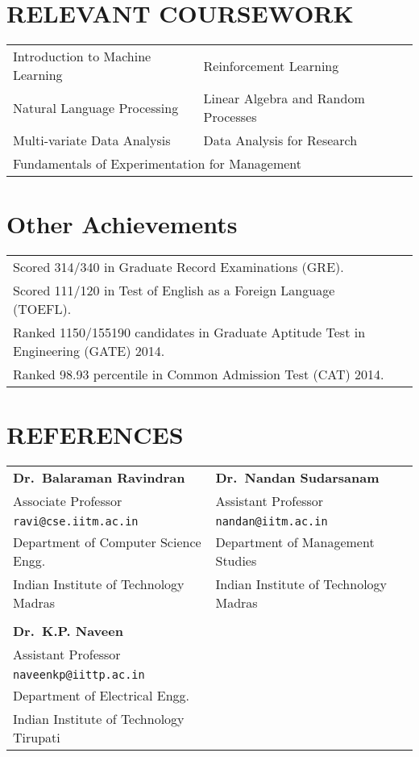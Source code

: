 \documentclass[margin,11pt]{res}
\begin{document}
\begin{resume}
\section{RELEVANT COURSEWORK}
\begin{tabular}{ll}
Introduction to Machine Learning & Reinforcement Learning  \\
Natural Language Processing & Linear Algebra and Random Processes \\
Multi-variate Data Analysis & Data Analysis for Research \\
\multicolumn{2}{l}{Fundamentals of Experimentation for Management}
\end{tabular}

\section{Other Achievements}
\begin{tabular}{ll}
Scored 314/340 in Graduate Record Examinations (GRE).\\
Scored 111/120 in Test of English as a Foreign Language (TOEFL).\\
Ranked 1150/155190 candidates in Graduate Aptitude Test in Engineering (GATE) 2014. \\
Ranked 98.93 percentile in Common Admission Test (CAT) 2014.
\end{tabular}

\section{REFERENCES}
\begin{tabular}{lll}
\textbf{Dr.~Balaraman Ravindran} & \textbf{Dr.~Nandan Sudarsanam} \\
Associate Professor & Assistant Professor\\
\texttt{ravi@cse.iitm.ac.in} & \texttt{nandan@iitm.ac.in}\\
Department of Computer Science Engg. & Department of Management Studies\\ 
Indian Institute of Technology Madras & Indian Institute of Technology Madras\\
\\
\textbf{Dr.~K.P. Naveen} \\
Assistant Professor\\
\texttt{naveenkp@iittp.ac.in}\\
Department of Electrical Engg.\\ 
Indian Institute of Technology Tirupati

\end{tabular}



\end{resume}
\end{document}
